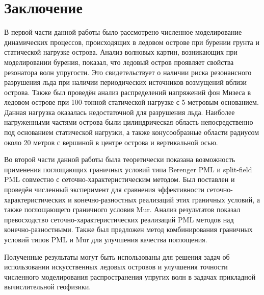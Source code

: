 \section{Заключение}

В первой части данной работы было рассмотрено численное моделирование динамических процессов, происходящих в ледовом острове при бурении грунта и статической нагрузке острова. Анализ волновых картин, возникающих при моделировании бурения, показал, что ледовый остров проявляет свойства резонатора волн упругости. Это свидетельствует о наличии риска резонансного разрушения льда при наличии периодических источников возмущений вблизи острова. Также был проведён анализ распределений напряжений фон Мизеса в ледовом острове при 100-тонной статической нагрузке с 5-метровым основанием. Данная нагрузка оказалась недостаточной для разрушения льда. Наиболее нагруженными частями острова были цилиндрическая область непосредственно под основанием статической нагрузки, а также конусообразные области радиусом около 20 метров с вершиной в центре острова и вертикальной осью.

Во второй части данной работы была теоретически показана возможность применения поглощающих граничных условий типа Berenger PML и split-field PML совместно с сеточно-харак\-теристическим методом. Был поставлен и проведён численный эксперимент для сравнения эффективности сеточно-характеристических и конечно-разностных реализаций этих граничных условий, а также поглощающего граничного условия Mur. Анализ результатов показал превосходство сеточно-харак\-теристических реализаций PML методов над конечно-разностными. Также был предложен метод комбинирования граничных условий типов PML и Mur для улучшения качества поглощения. 

Полученные результаты могут быть использованы для решения задач об использовании искусственных ледовых островов и улучшения точности численного моделирования распространения упругих волн в задачах прикладной вычислительной геофизики.